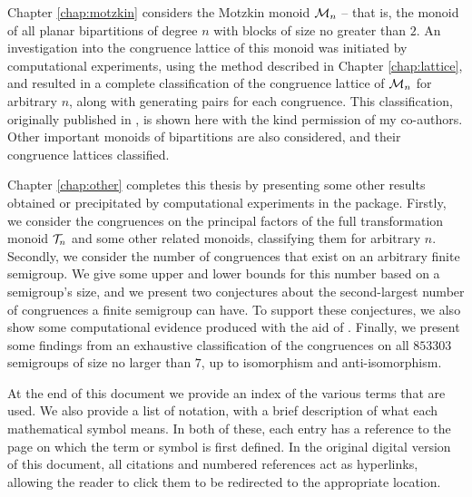 Chapter \ref{chap:motzkin} considers the Motzkin monoid $\mathcal{M}_n$ -- that is, the monoid of
all planar bipartitions of degree $n$ with blocks of size no greater than $2$.
An investigation into the congruence lattice of this monoid was initiated by
computational experiments, using the method described in Chapter
\ref{chap:lattice}, and resulted in a complete classification of the congruence
lattice of $\mathcal{M}_n$ for arbitrary $n$, along with generating pairs for each
congruence.  This classification, originally published in \cite{ourpaper}, is
shown here with the kind permission of my co-authors.  Other important monoids
of bipartitions are also considered, and their congruence lattices classified.

Chapter \ref{chap:other} completes this thesis by presenting some other results
obtained or precipitated by computational experiments in the \Semigroups{}
package.  Firstly, we consider the congruences on the principal factors of the
full transformation monoid $\mathcal{T}_n$ and some other related monoids, classifying
them for arbitrary $n$.  Secondly, we consider the number of congruences that
exist on an arbitrary finite semigroup.  We give some upper and lower bounds for
this number based on a semigroup's size, and we present two conjectures about
the second-largest number of congruences a finite semigroup can have.  To
support these conjectures, we also show some computational evidence produced
with the aid of \smallsemi{} \cite{smallsemi}.  Finally, we present some
findings from an exhaustive classification of the congruences on all $853303$
semigroups of size no larger than $7$, up to isomorphism and anti-isomorphism.

At the end of this document we provide an index of the various terms that are
used.  We also provide a list of notation, with a brief description of what each
mathematical symbol means.  In both of these, each entry has a reference to the
page on which the term or symbol is first defined.  In the original digital
version of this document, all citations and numbered references act as
hyperlinks, allowing the reader to click them to be redirected to the
appropriate location.
